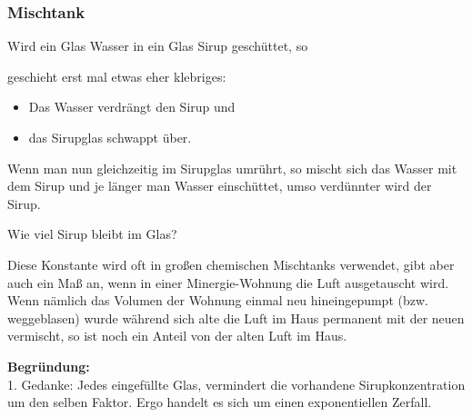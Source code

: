 \subsubsection{Mischtank}\label{sirup_beispiel}
Wird ein Glas Wasser in ein Glas Sirup geschüttet, so


geschieht erst mal etwas eher klebriges:
\begin{itemize}
  \item Das Wasser verdrängt den Sirup und
  \item das Sirupglas schwappt über.
\end{itemize}

Wenn man nun gleichzeitig im Sirupglas
umrührt, so mischt sich das Wasser mit dem Sirup und je länger man
Wasser einschüttet, umso verdünnter wird der Sirup.


Wie viel Sirup bleibt im Glas?


Diese Konstante wird oft in großen chemischen Mischtanks verwendet,
gibt aber auch ein Maß an, wenn \zB in einer Minergie-Wohnung die Luft
ausgetauscht wird. Wenn nämlich das Volumen der Wohnung einmal neu hineingepumpt (bzw. weggeblasen) wurde während sich alte die Luft im Haus permanent mit der neuen vermischt, so ist noch ein Anteil von  der alten Luft im Haus.
\newpage


\textbf{Begründung:}\\
1. Gedanke: Jedes eingefüllte Glas, vermindert die vorhandene
Sirupkonzentration um den selben Faktor. Ergo handelt es sich um
einen exponentiellen Zerfall.

\leserluft

